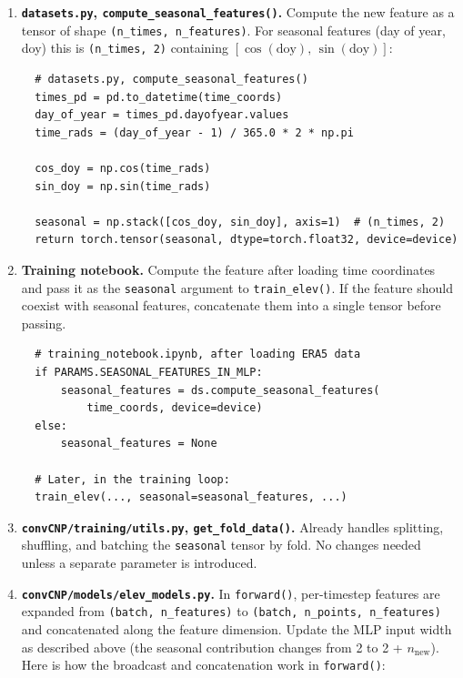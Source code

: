 \begin{enumerate}
  \item \textbf{\texttt{datasets.py}, \texttt{compute\_seasonal\_features()}.}
  Compute the new feature as a tensor of shape \texttt{(n\_times, n\_features)}.
  For seasonal features (day of year, doy) this is \texttt{(n\_times, 2)} containing $[\cos(\text{doy}),\, \sin(\text{doy})]$:

\begin{verbatim}
  # datasets.py, compute_seasonal_features()
  times_pd = pd.to_datetime(time_coords)
  day_of_year = times_pd.dayofyear.values
  time_rads = (day_of_year - 1) / 365.0 * 2 * np.pi

  cos_doy = np.cos(time_rads)
  sin_doy = np.sin(time_rads)

  seasonal = np.stack([cos_doy, sin_doy], axis=1)  # (n_times, 2)
  return torch.tensor(seasonal, dtype=torch.float32, device=device)
\end{verbatim}

  \item \textbf{Training notebook.}
  Compute the feature after loading time coordinates and pass it as the \texttt{seasonal} argument to \texttt{train\_elev()}.
  If the feature should coexist with seasonal features, concatenate them into a single tensor before passing.

\begin{verbatim}
  # training_notebook.ipynb, after loading ERA5 data
  if PARAMS.SEASONAL_FEATURES_IN_MLP:
      seasonal_features = ds.compute_seasonal_features(
          time_coords, device=device)
  else:
      seasonal_features = None

  # Later, in the training loop:
  train_elev(..., seasonal=seasonal_features, ...)
\end{verbatim}

  \item \textbf{\texttt{convCNP/training/utils.py}, \texttt{get\_fold\_data()}.}
  Already handles splitting, shuffling, and batching the \texttt{seasonal} tensor by fold.
  No changes needed unless a separate parameter is introduced.

  \item \textbf{\texttt{convCNP/models/elev\_models.py}.}
  In \texttt{forward()}, per-timestep features are expanded from \texttt{(batch, n\_features)} to \texttt{(batch, n\_points, n\_features)} and concatenated along the feature dimension.
  Update the MLP input width as described above (the seasonal contribution changes from 2 to 2 + $n_{\text{new}}$).
  Here is how the broadcast and concatenation work in \texttt{forward()}:


\end{enumerate}
